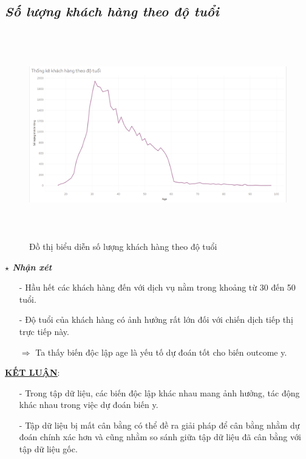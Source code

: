 \documentclass{report}
\begin{document}
\subsection{\textit{Số lượng khách hàng theo độ tuổi}}
         \begin{center}
        \begin{figure}[htp]
    	\begin{center}
    		\includegraphics[width=15cm, height=9cm]{images/hinh8.png}
    	\end{center}
    		\caption{Đồ thị biểu diễn số lượng khách hàng theo độ tuổi}
    \end{figure}
    \end{center}
    \fontsize{13}{14}\selectfont \textbf{$\star$\textit{ Nhận xét}}
    \begin{enumerate}
        \item[- ] Hầu hết các khách hàng đến với dịch vụ nằm trong khoảng từ 30 đến 50 tuổi. 
        \item[- ] Độ tuổi của khách hàng có ảnh hưởng rất lớn đối với chiến dịch tiếp thị trực tiếp này.
        \item [$\Rightarrow$] Ta thấy biến độc lập age là yếu tố dự đoán tốt cho biến outcome y.
    \end{enumerate}
   \fontsize{13}{14}\selectfont\textbf{\underline{\underline{{KẾT LUẬN}}}}:
   \begin{enumerate}
        \item [- ] Trong tập dữ liệu, các biến độc lập khác nhau mang ảnh hưởng, tác động khác nhau trong việc dự đoán biến y. 
        \item [- ] Tập dữ liệu bị mất cân bằng có thể đề ra giải pháp để cân bằng nhằm dự đoán chính xác hơn và cũng nhằm so sánh giữa tập dữ liệu đã cân bằng với tập dữ liệu gốc.
    \end{enumerate}
\fontsize{14}{10}\selectfont
\end{document}
